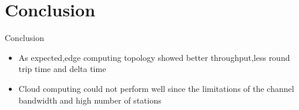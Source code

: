 \documentclass{beamer}
\begin{document}
\section{Conclusion}

\begin{frame}{Conclusion}
\begin{itemize}
	\item As expected,edge computing topology showed better throughput,less round trip time and delta time
	\item Cloud computing could not perform well since the limitations of the channel bandwidth and high number of stations
\end{itemize}
\end{frame}
\end{document}
